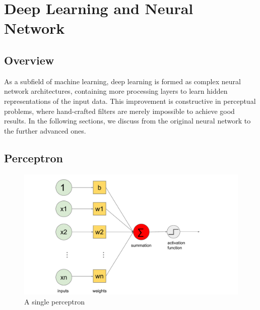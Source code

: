 \section{Deep Learning and Neural Network}
\label{model:mlp}

\subsection{Overview}
As a subfield of machine learning, deep learning is formed as complex neural network architectures, containing more processing layers to learn hidden representations of the input data. This improvement is constructive in perceptual problems, where hand-crafted filters are merely impossible to achieve good results. In the following sections, we discuss from the original neural network to the further advanced ones.

\subsection{Perceptron}

\begin{figure}[!h]
    \centering
    \includegraphics[width=\textwidth]{content/resources/new_images/related_works/perceptron.pdf}
    \caption{A single perceptron}
    \label{fig:perceptron}
\end{figure}

